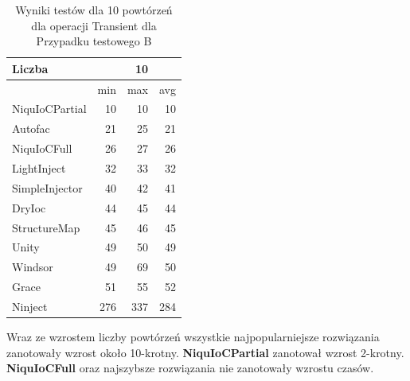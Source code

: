 \documentclass[12pt]{article}
\begin{document}
\begin{table}[H]
\captionsetup{belowskip=0pt,aboveskip=0pt}
\begin{center}
\begin{small}
	\begin{tabular}{ | l | r r r | }
    		\hline
Liczba & & 10 & \\ \hline
 & min & max & avg \\ \hline
NiquIoCPartial & 10 & 10 & 10 \\ \hline
Autofac & 21 & 25 & 21 \\ \hline
NiquIoCFull & 26 & 27 & 26 \\ \hline
LightInject & 32 & 33 & 32 \\ \hline
SimpleInjector & 40 & 42 & 41 \\ \hline
DryIoc & 44 & 45 & 44 \\ \hline
StructureMap & 45 & 46 & 45 \\ \hline
Unity & 49 & 50 & 49 \\ \hline
Windsor & 49 & 69 & 50 \\ \hline
Grace & 51 & 55 & 52 \\ \hline
Ninject & 276 & 337 & 284 \\ \hline
  	\end{tabular}
\end{small}
\end{center}
\caption{Wyniki testów dla 10 powtórzeń dla operacji Transient dla Przypadku testowego B}
\label{TestCaseB_Transient10}
\end{table}
Wraz ze wzrostem liczby powtórzeń wszystkie najpopularniejsze rozwiązania zanotowały wzrost około 10-krotny. \textbf{NiquIoCPartial} zanotował wzrost 2-krotny. \textbf{NiquIoCFull} oraz najszybsze rozwiązania nie zanotowały wzrostu czasów.
\\ \\
\end{document}
